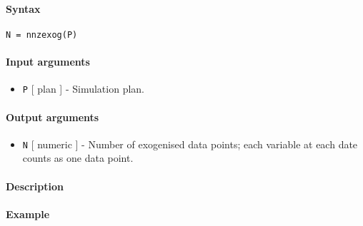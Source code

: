 


	\paragraph{Syntax}\label{syntax}

\begin{verbatim}
N = nnzexog(P)
\end{verbatim}

\paragraph{Input arguments}\label{input-arguments}

\begin{itemize}
\itemsep1pt\parskip0pt
\item
  \texttt{P} {[} plan {]} - Simulation plan.
\end{itemize}

\paragraph{Output arguments}\label{output-arguments}

\begin{itemize}
\itemsep1pt\parskip0pt
\item
  \texttt{N} {[} numeric {]} - Number of exogenised data points; each
  variable at each date counts as one data point.
\end{itemize}

\paragraph{Description}\label{description}

\paragraph{Example}\label{example}


